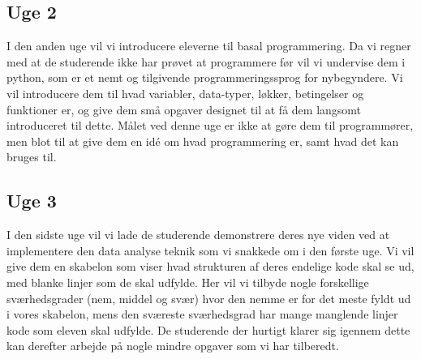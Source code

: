 \documentclass[11pt]{article}
\begin{document}
    \subsection{Uge 2}
        I den anden uge vil vi introducere eleverne til basal programmering. Da 
        vi regner med at de studerende ikke har prøvet at programmere før 
        vil vi undervise dem i python, som er et nemt og tilgivende 
        programmeringssprog for nybegyndere. Vi vil introducere dem til hvad 
        variabler, data-typer, løkker, betingelser og funktioner er, og give 
        dem små opgaver designet til at få dem langsomt introduceret til 
        dette. Målet ved denne uge er ikke at gøre dem til  
        programmører, men blot til at give dem en idé om hvad programmering er, 
        samt hvad det kan bruges til.
         
    \subsection{Uge 3}
        I den sidste uge vil vi lade de studerende demonstrere deres nye viden 
        ved at implementere den data analyse teknik som vi snakkede om i den 
        første uge. Vi vil give dem en skabelon som viser hvad strukturen af 
        deres endelige kode skal se ud, med blanke linjer som de skal udfylde. 
        Her vil vi tilbyde nogle forskellige sværhedsgrader (nem, middel og svær) 
        hvor den nemme er for det meste fyldt ud i vores skabelon, mens den 
        sværeste sværhedsgrad har mange manglende linjer kode som eleven skal 
        udfylde. De studerende der hurtigt klarer sig igennem dette kan derefter 
        arbejde på nogle mindre opgaver som vi har tilberedt.
  
\end{document}
